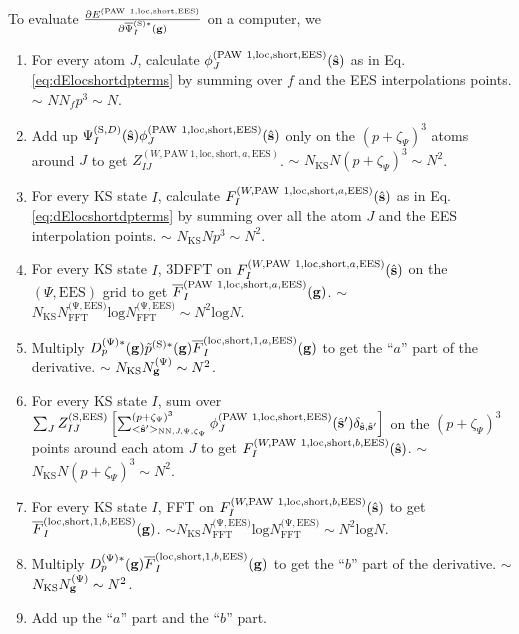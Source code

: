 \documentclass[paper=a4, fontsize=11pt]{article} %
\numberwithin{equation}{section} %
\numberwithin{figure}{section} %
\numberwithin{table}{section} %
\newcommand{\p}{\partial}
\newcommand{\ol}{\overline}
\newcommand{\bs}{{\bf{s}}}
\newcommand{\bg}{{\bf{g}}}
\newcommand{\hs}{{\hat{\bf{s}}}}
\newcommand{\rS}{{\mathrm{S}}}
\newcommand{\rEES}{{\mathrm{EES}}}
\newcommand{\rNN}{{\mathrm{NN}}}
\newcommand{\rshort}{{\mathrm{short}}}
\newcommand{\rP}{{\mathrm{PAW}}}
\newcommand{\rlo}{{\mathrm{loc}}}
\newcommand{\rl}{{\mathrm{log}}}
\newcommand{\psigsc}{{\overline \Psi_I^{(\rS)*}(\bg)}}
\newcommand{\NKS}{{N_{\mathrm{KS}}}}
\newcommand{\NFFTpEES}{{N^{\mathrm{(\Psi,\rEES})}_{\mathrm{FFT}}}}
\newcommand{\Ngp}{{N^{\mathrm{(\Psi})}_\bg}}
\newcommand{\Dpgc}{{D^{(\Psi)*}_p(\bg)}}
\newcommand{\pzp}{{(p+\zeta_{\Psi})^3}}
\newcommand{\hspJp}{{<\hs'>_{\rNN,J,\Psi,\zeta_\Psi}}}
\begin{document}
To evaluate $\frac{\p E^{(\rP\ 1,\rlo,\rshort,\rEES)}}{\p \psigsc}$ on a computer, we
\begin{enumerate}
\item For every atom $J$, calculate $\phi_J^{(\rP\ 1,\rlo,\rshort,\rEES)}(\hs)$ as in Eq.\eqref{eq:dElocshortdpterms} by summing over $f$ and the EES interpolations points. $\sim$ $NN_fp^3 \sim N$.
\item Add up $\Psi_{I}^{(\rS,D)}(\hat \bs) \phi_J^{(\rP\ 1,\rlo,\rshort,\rEES)}(\hs)$ only on the $\pzp$ atoms around $J$ to get $Z_{IJ}^{(W,\rP\ 1,\rlo,\rshort,a,\rEES)}$. $\sim$ $\NKS N \pzp \sim N^2$.
\item For every KS state $I$, calculate $F_I^{(W,\rP\ 1,\rlo,\rshort,a,\rEES)}(\hs)$ as in Eq.\eqref{eq:dElocshortdpterms} by summing over all the atom $J$ and the EES interpolation points. $\sim$ $\NKS N p^3 \sim N^2$.
\item For every KS state $I$, 3DFFT on $F_I^{(W,\rP\ 1,\rlo,\rshort,a,\rEES)}(\hs)$ on the $(\Psi,\rEES)$ grid to get $\ol F_I^{(\rP\ 1,\rlo,\rshort,a,\rEES)}(\bg)$. $\sim$ $\NKS \NFFTpEES \rl \NFFTpEES \sim N^2 \rl N$.
\item Multiply $\Dpgc \tilde p^{(\rS)*}(\bg) \ol F_I^{(\rlo,\rshort,1,a,\rEES)}(\bg)$ to get the ``$a$'' part of the derivative. $\sim$ $\NKS \Ngp \sim N^2$.
\item For every KS state $I$, sum over $\sum_J Z_{IJ}^{(\rS,\rEES)}\left[\sum_{\hspJp}^\pzp \phi_J^{(\rP\ 1,\rlo,\rshort,\rEES)}(\hs') \delta_{\hs,\hs'}\right]$ on the $\pzp$ points around each atom $J$ to get $F_I^{(W,\rP\ 1,\rlo,\rshort,b,\rEES)}(\hs)$. $\sim$ $\NKS N \pzp \sim N^2$.
\item For every KS state $I$, FFT on $F_I^{(W,\rP\ 1,\rlo,\rshort,b,\rEES)}(\hs)$ to get $\ol F_I^{(\rlo,\rshort,1,b,\rEES)}(\bg)$. $\sim \NKS \NFFTpEES \rl \NFFTpEES \sim N^2 \rl N$.
\item Multiply $\Dpgc \ol F_I^{(\rlo,\rshort,1,b,\rEES)}(\bg)$ to get the ``$b$'' part of the derivative. $\sim$ $\NKS \Ngp \sim N^2$.
\item Add up the ``$a$'' part and the ``$b$'' part.
\end{enumerate}
\end{document}
